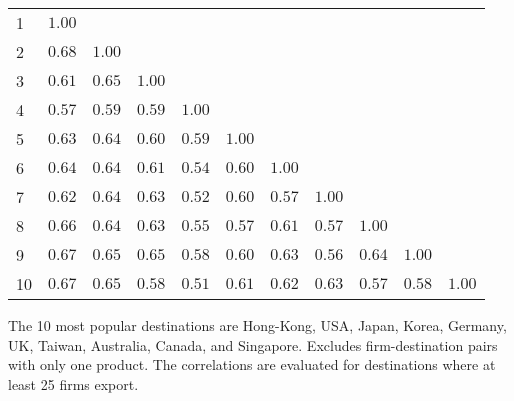 \documentclass{article}
\begin{document}
\begin{table}[h]
{\begin{threeparttable}
\begin{tabular}{lrrrrrrrrrr}
1 & $1.00$   &              &             &             &              &            &               &            &             &                        \\  
2 & $0.68$   & $1.00$     &             &             &              &            &               &            &             &                        \\  
3 & $0.61$   & $0.65$     & $1.00$    &             &              &            &               &            &             &                        \\  
4 & $0.57$   & $0.59$     & $0.59$    &  $1.00$   &              &            &               &            &             &                         \\  
5 & $0.63$   & $0.64$     & $0.60$    &  $0.59$   & $1.00$     &            &               &            &             &                         \\  
6 & $0.64$   & $0.64$     & $0.61$    &  $0.54$   & $0.60$     &  $1.00$  &               &            &             &                         \\  
7 & $0.62$   & $0.64$     & $0.63$    &  $0.52$   & $0.60$     &  $0.57$  &  $1.00$     &            &             &                         \\  
8 & $0.66$   & $0.64$     & $0.63$    &  $0.55$   & $0.57$     &  $0.61$  &  $0.57$     & $1.00$   &             &                         \\  
9 & $0.67$   & $0.65$     & $0.65$    &  $0.58$   & $0.60$     &  $0.63$  &  $0.56$     & $0.64$   & $1.00$    &                         \\  
10 & $0.67$ & $0.65$    & $0.58$   &  $0.51$  & $0.61$    &  $0.62$ &  $0.63$    & $0.57$  & $0.58$   & $1.00$ \\  
\hline
\end{tabular}
\begin{tablenotes}
\small
\item  \noindent  \footnotesize{The 10 most popular destinations are Hong-Kong, USA, Japan, Korea, Germany, UK, Taiwan, Australia, Canada, and Singapore. Excludes firm-destination pairs with only one product. The correlations are evaluated for destinations where at least 25 firms export.}
\end{tablenotes}
\end{threeparttable}
}
\end{table}
\end{document}
